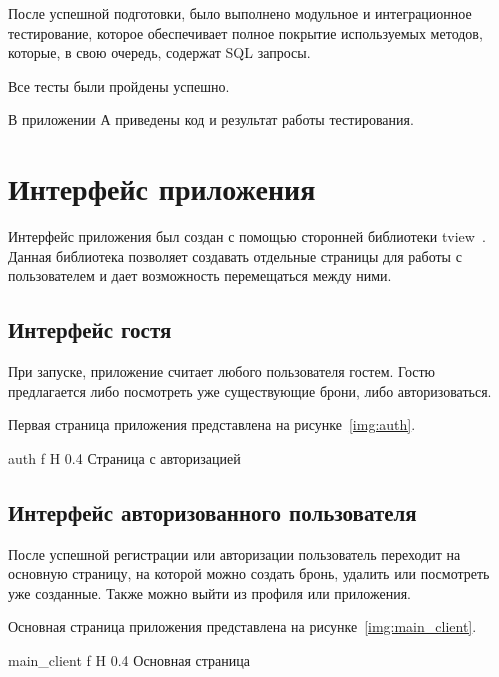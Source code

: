 После успешной подготовки, было выполнено модульное и интеграционное тестирование, которое обеспечивает полное покрытие используемых методов, которые, в свою очередь, содержат SQL запросы.

Все тесты были пройдены успешно.

В приложении А приведены код и результат работы тестирования. 

\section{Интерфейс приложения}
Интерфейс приложения был создан с помощью сторонней библиотеки tview~\cite{golang_tview}.
Данная библиотека позволяет создавать отдельные страницы для работы с пользователем и дает возможность перемещаться между ними. 

\subsection{Интерфейс гостя}

При запуске, приложение считает любого пользователя гостем. 
Гостю предлагается либо посмотреть уже существующие брони, либо авторизоваться.

Первая страница приложения представлена на рисунке~\ref{img:auth}.




{auth} %
{f} %
{H} %
{0.4\textwidth} %
{Страница с авторизацией} %



\subsection{Интерфейс авторизованного пользователя}
После успешной регистрации или авторизации пользователь переходит на основную страницу, на которой можно создать бронь, удалить или посмотреть уже созданные.
Также можно выйти из профиля или приложения.

Основная страница приложения представлена на рисунке~\ref{img:main_client}.




{main_client} %
{f} %
{H} %
{0.4\textwidth} %
{Основная страница} %



